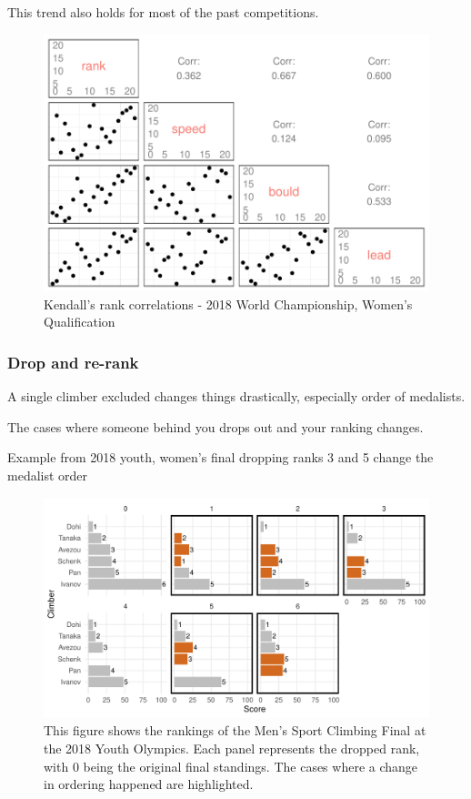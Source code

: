\documentclass[12pt]{article}
\begin{document}
This trend also holds for most of the past competitions.

\begin{figure}[H]
\centering
\includegraphics{draft_files/figure-latex/unnamed-chunk-10-1.pdf}
\caption{Kendall's rank correlations - 2018 World Championship, Women's
Qualification}
\end{figure}

\hypertarget{drop-and-re-rank}{%
\subsubsection{Drop and re-rank}\label{drop-and-re-rank}}

A single climber excluded changes things drastically, especially order
of medalists.

The cases where someone behind you drops out and your ranking changes.

Example from 2018 youth, women's final dropping ranks 3 and 5 change the
medalist order

\begin{figure}[H]
\centering
\includegraphics{draft_files/figure-latex/unnamed-chunk-12-1.pdf}
\caption{This figure shows the rankings of the Men's Sport Climbing
Final at the 2018 Youth Olympics. Each panel represents the dropped
rank, with 0 being the original final standings. The cases where a
change in ordering happened are highlighted.}
\end{figure}
\end{document}
